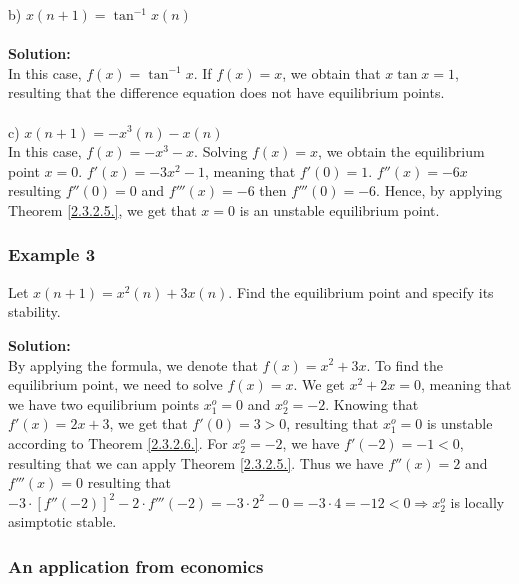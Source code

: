 \documentclass[a4paper,12pt]{report}
\begin{document}
b) $x(n+1)=\tan^{-1}{x(n)}$ \\ \\
\textbf{Solution:}\\

In this case, $f(x)=\tan^{-1}{x}$. If $f(x)=x$, we obtain that $x\tan{x}=1$, resulting that the difference equation does not have equilibrium points. \\ \\
c) $x(n+1)=-x^{3}(n)-x(n)$\\
In this case, $f(x)=-x^{3}-x$. Solving $f(x)=x$, we obtain the equilibrium point $x=0$. $f'(x)=-3x^{2}-1$, meaning that $f'(0)=1$. $f''(x)=-6x$ resulting $f''(0)=0$ and $f'''(x)=-6$ then $f'''(0)=-6$. Hence, by applying Theorem \ref{2.3.2.5.}, we get that $x=0$ is an unstable equilibrium point. 

\subsubsection{Example 3} Let $x(n+1)=x^{2}(n)+3x(n)$. Find the equilibrium point and specify its stability.

\textbf{Solution:}\\
By applying the formula, we denote that $f(x)=x^{2}+3x$. To find the equilibrium point, we need to solve $f(x)=x$. We get $x^{2}+2x=0$, meaning that we have two equilibrium points $x^{o}_{1}=0$ and $x_{2}^{o}=-2$. Knowing that $f'(x)=2x+3$, we get that $f'(0)=3>0$, resulting that $x_{1}^{o}=0$ is unstable according to Theorem \ref{2.3.2.6.}. For $x_{2}^{o}=-2$, we have $f'(-2)=-1<0$, resulting that we can apply Theorem \ref{2.3.2.5.}. Thus we have $f''(x)=2$ and $f'''(x)=0$ resulting that $-3\cdot [f''(-2)]^{2}-2\cdot f'''(-2)=-3\cdot 2^{2}-0=-3\cdot 4=-12<0 \Rightarrow x_{2}^{o}$ is locally asimptotic stable. 

\subsubsection{An application from economics} 
\end{document}
